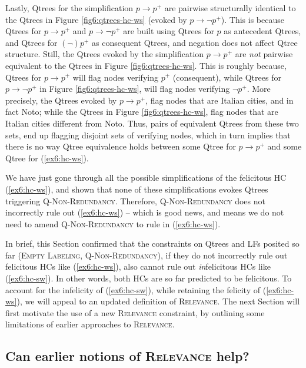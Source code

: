 Lastly, Qtrees for the simplification $p\rightarrow p^+$ are pairwise structurally identical to the Qtrees in Figure \ref{fig6:qtrees-hc-ws} (evoked by $p \rightarrow\neg p^+$). This is because Qtrees for $p\rightarrow p^+$ and $p\rightarrow \neg p^+$ are built using Qtrees for $p$ as antecedent Qtrees, and Qtrees for $(\neg)p^+$ as consequent Qtrees, and negation does not affect Qtree structure. Still, the Qtrees evoked by the simplification $p\rightarrow p^+$ are \textit{not} pairwise equivalent to the Qtrees in Figure \ref{fig6:qtrees-hc-ws}. This is roughly because, Qtrees for $p\rightarrow p^+$ will flag nodes verifying $p^+$ (consequent), while Qtrees for $p\rightarrow \neg p^+$ in Figure \ref{fig6:qtrees-hc-ws}, will flag nodes verifying $\neg p^+$. More precisely, the Qtrees evoked by $p\rightarrow p^+$, flag nodes that are Italian cities, and in fact Noto; while the Qtrees in Figure \ref{fig6:qtrees-hc-ws}, flag nodes that are Italian cities different from Noto. Thus, pairs of equivalent Qtrees from these two sets, end up flagging disjoint sets of verifying nodes, which in turn implies that there is no way Qtree equivalence holds between some Qtree for $p\rightarrow p^+$ and some Qtree for (\ref{ex6:hc-ws}).

We have just gone through all the possible simplifications of the felicitous HC (\ref{ex6:hc-ws}), and shown that none of these simplifications evokes Qtrees triggering \textsc{Q-Non-Redundancy}. Therefore, \textsc{Q-Non-Redundancy} does not incorrectly rule out (\ref{ex6:hc-ws}) -- which is good news, and means we do not need to amend \textsc{Q-Non-Redundancy} to rule in (\ref{ex6:hc-ws}). 




In brief, this Section confirmed that the constraints on Qtrees and LFs posited so far (\textsc{Empty Labeling}, \textsc{Q-Non-Redundancy}), if they do not incorrectly rule out felicitous HCs like (\ref{ex6:hc-ws}), also cannot rule out \textit{in}felicitous HCs like (\ref{ex6:hc-sw}). In other words, both HCs are so far predicted to be felicitous. To account for the infelicity of (\ref{ex6:hc-sw}), while retaining the felicity of (\ref{ex6:hc-ws}), we will appeal to an updated definition of \textsc{Relevance}. The next Section will first motivate the use of a new \textsc{Relevance} constraint, by outlining some limitations of earlier approaches to \textsc{Relevance}.

\subsection{Can earlier notions of \textsc{Relevance} help?}

